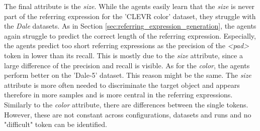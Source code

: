 The final attribute is the \emph{size}.
While the agents easily learn that the \emph{size} is never part of the referring expression for the 'CLEVR color' dataset, they struggle with the \emph{Dale} datasets.
As in Section \ref{sec:referring_expression_generation}, the agents again struggle to predict the correct length of the referring expression.
Especially, the agents predict too short referring expressions as the precision of the \emph{<pad>} token in lower than its recall.
This is mostly due to the \emph{size} attribute, since a large difference of the precision and recall is visible.
As for the \emph{color}, the agents perform better on the 'Dale-5' dataset.
This reason might be the same.
The \emph{size} attribute is more often needed to discriminate the target object and appears therefore in more samples and is more central in the referring expressions.
Similarly to the \emph{color} attribute, there are differences between the single tokens.
However, these are not constant across configurations, datasets and runs and no "difficult" token can be identified.

